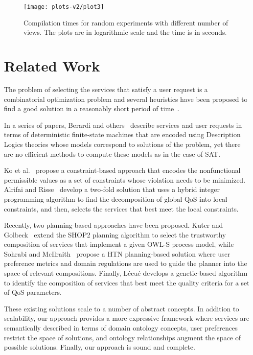 \documentclass{llncs}
\begin{document}
\begin{figure}[t]
\centering
\texttt{[image: plots-v2/plot3]}
\caption{Compilation times for random experiments with different number of views.
The plots are in logarithmic scale and the time is in seconds. }
\label{fig:random}
\end{figure}

\section{Related Work}

The problem of selecting the services that satisfy a user request is a
combinatorial optimization problem and several heuristics have been
proposed to find a good solution in a reasonably short period of
time~\cite{alrifaiR09,berardi08,myoung08,kuterG09,lecue09,rahmani08,sohrabiM09,Hiroshi2008}.

In a series of papers, Berardi and
others~\cite{berardi05,berardi08,berardi06} describe services and user
requests in terms of deterministic finite-state machines that are
encoded using Description Logics theories whose models correspond to
solutions of the problem, yet there are no efficient methods to compute
these models as in the case of SAT.

Ko et al.~\cite{myoung08} propose a constraint-based approach that encodes
the nonfunctional permissible
values as a set of constraints whose violation needs to
be minimized. Alrifai and Risse~\cite{alrifaiR09} develop a two-fold
solution that uses a hybrid integer programming algorithm to find the
decomposition of global QoS into local constraints, and then, selects
the services that best meet the local constraints.   

Recently, two planning-based approaches have been proposed. Kuter
and Golbeck~\cite{kuterG09} extend the SHOP2 planning algorithm to
select the trustworthy composition of services that implement a given
OWL-S process model, while Sohrabi and McIlraith~\cite{sohrabiM09}
propose a HTN planning-based solution where user preference metrics
and domain regulations are used to guide the planner into the space
of relevant compositions. Finally, L\'ecu\'e \cite{lecue09}  develops
a genetic-based algorithm to identify the composition of services
that best meet the quality criteria for a set of QoS parameters.

These existing solutions scale to a number of abstract concepts.
In addition to scalability, our approach provides a more expressive
framework where services are semantically
described in terms of domain ontology concepts, user preferences
restrict the space of solutions, and ontology relationships augment
the space of possible solutions. Finally, our approach is sound and
complete.
\end{document}
